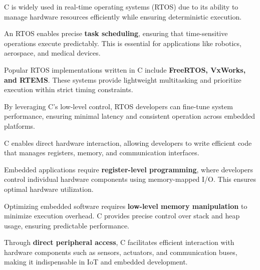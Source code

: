 \begin{NxSSSSBox}
	\begin{NxIDBox}
		C is widely used in real-time operating systems (RTOS) due to its ability to manage hardware resources efficiently while ensuring deterministic execution.
	\end{NxIDBox}
	\begin{NxIDBox}
		An RTOS enables precise \textbf{task scheduling}, ensuring that time-sensitive operations execute predictably. This is essential for applications like robotics, aerospace, and medical devices.
	\end{NxIDBox}
	\begin{NxIDBox}
		Popular RTOS implementations written in C include \textbf{FreeRTOS, VxWorks, and RTEMS}. These systems provide lightweight multitasking and prioritize execution within strict timing constraints.
	\end{NxIDBox}
	\begin{NxIDBox}
		By leveraging C’s low-level control, RTOS developers can fine-tune system performance, ensuring minimal latency and consistent operation across embedded platforms.
	\end{NxIDBox}
\end{NxSSSSBox}

\begin{NxSSSSBox}
	\begin{NxIDBox}
		C enables direct hardware interaction, allowing developers to write efficient code that manages registers, memory, and communication interfaces.
	\end{NxIDBox}
	\begin{NxIDBox}
		Embedded applications require \textbf{register-level programming}, where developers control individual hardware components using memory-mapped I/O. This ensures optimal hardware utilization.
	\end{NxIDBox}
	\begin{NxIDBox}
		Optimizing embedded software requires \textbf{low-level memory manipulation} to minimize execution overhead. C provides precise control over stack and heap usage, ensuring predictable performance.
	\end{NxIDBox}
	\begin{NxIDBox}
		Through \textbf{direct peripheral access}, C facilitates efficient interaction with hardware components such as sensors, actuators, and communication buses, making it indispensable in IoT and embedded development.
	\end{NxIDBox}
\end{NxSSSSBox}

